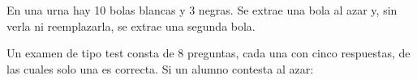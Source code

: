 \documentclass[addpoints,spanish, 12pt,a4paper]{exam}
\begin{document}
\begin{questions}


\question En una urna hay 10 bolas blancas y 3 negras. Se extrae una bola al azar y, sin verla ni
reemplazarla, se extrae una segunda bola.

\question Un examen de tipo test consta de 8 preguntas, cada una con cinco respuestas, de las cuales solo
una es correcta. Si un alumno contesta al azar:
\begin{parts}

\end{parts}
\end{questions}
\end{document}
